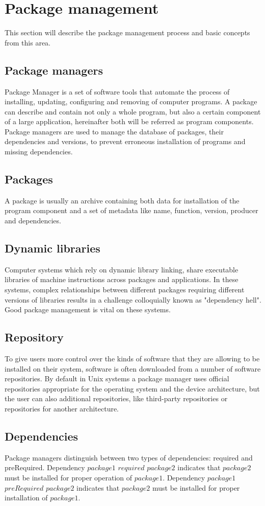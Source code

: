 \section{Package management} \label{sec:pm}
This section will describe the package management process and basic concepts from this area.
\subsection*{Package managers}
Package Manager is a set of software tools that automate the process of installing, updating, configuring and removing of computer programs.
A package can describe and contain not only a whole program, but also a certain component of a large application, hereinafter both will be referred as program components.
Package managers are used to manage the database of packages, their dependencies and versions, to prevent erroneous installation of programs and missing dependencies.
\subsection*{Packages}
A package is usually an archive containing both data for installation of the program component and a set of metadata like name, function, version, producer and dependencies.
\subsection*{Dynamic libraries}
Computer systems which rely on dynamic library linking, share executable libraries of machine instructions across packages and applications. 
In these systems, complex relationships between different packages requiring different versions of libraries results in a challenge colloquially known as "dependency hell".
Good package management is vital on these systems.
\subsection*{Repository}
To give users more control over the kinds of software that they are allowing to be installed on their system, software is often downloaded from a number of software repositories.
By default in Unix systems a package manager uses official repositories appropriate for the operating system and the device architecture, but the user can also additional repositories, like third-party repositories or repositories for another architecture.
\subsection*{Dependencies}
Package managers distinguish between two types of dependencies: required and preRequired.
Dependency $package1$ $required$ $package2$ indicates that $package2$ must be installed for proper operation of $package1$.
Dependency $package1$ $preRequired$ $package2$ indicates that $package2$ must be installed for proper installation of $package1$.
